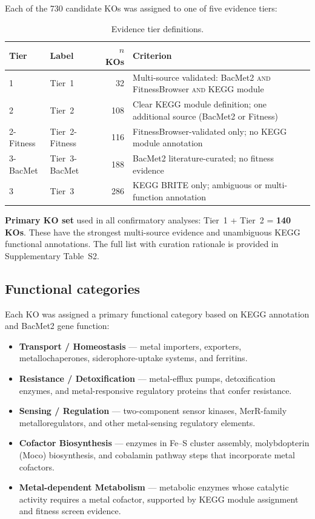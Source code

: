 \documentclass[11pt]{article}
\begin{document}
Each of the 730 candidate KOs was assigned to one of five evidence tiers:

\begin{table}[H]
\centering
\caption{Evidence tier definitions.}
\label{tab:tiers}
\small
\begin{tabular}{llrl}
\toprule
Tier & Label & $n$ KOs & Criterion \\
\midrule
1 & Tier~1 & 32 & Multi-source validated: BacMet2 \textsc{and} FitnessBrowser
  \textsc{and} KEGG module \\
2 & Tier~2 & 108 & Clear KEGG module definition; one additional source
  (BacMet2 or Fitness) \\
2-Fitness & Tier~2-Fitness & 116 & FitnessBrowser-validated only; no KEGG
  module annotation \\
3-BacMet & Tier~3-BacMet & 188 & BacMet2 literature-curated; no fitness
  evidence \\
3 & Tier~3 & 286 & KEGG BRITE only; ambiguous or multi-function annotation \\
\bottomrule
\end{tabular}
\end{table}

\textbf{Primary KO set} used in all confirmatory analyses: Tier~1 + Tier~2
= \textbf{140 KOs}.  These have the strongest multi-source evidence and
unambiguous KEGG functional annotations.  The full list with curation
rationale is provided in Supplementary Table~S2.

\subsection{Functional categories}

Each KO was assigned a primary functional category based on KEGG annotation
and BacMet2 gene function:

\begin{itemize}
\item \textbf{Transport / Homeostasis} — metal importers, exporters,
  metallochaperones, siderophore-uptake systems, and ferritins.

\item \textbf{Resistance / Detoxification} — metal-efflux pumps, detoxification
  enzymes, and metal-responsive regulatory proteins that confer resistance.

\item \textbf{Sensing / Regulation} — two-component sensor kinases, MerR-family
  metalloregulators, and other metal-sensing regulatory elements.

\item \textbf{Cofactor Biosynthesis} — enzymes in Fe--S cluster assembly,
  molybdopterin (Moco) biosynthesis, and cobalamin pathway steps that
  incorporate metal cofactors.

\item \textbf{Metal-dependent Metabolism} — metabolic enzymes whose catalytic
  activity requires a metal cofactor, supported by KEGG module assignment and
  fitness screen evidence.
\end{itemize}
\end{document}
